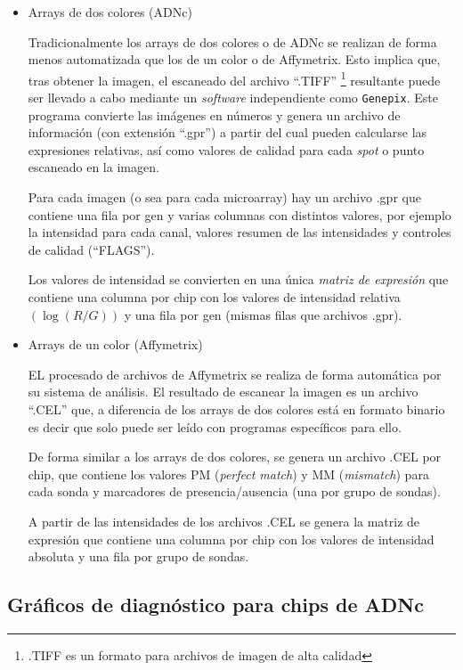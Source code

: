 \begin{itemize}
 \item Arrays de dos colores (ADNc)

Tradicionalmente los arrays de dos colores o de ADNc se realizan de forma menos automatizada que los de un color o de Affymetrix.
Esto implica que, tras obtener la imagen, el escaneado del archivo ``.TIFF''
\footnote{.TIFF es un formato para archivos de imagen de alta calidad} resultante puede ser llevado a cabo mediante un \emph{software} independiente
como \texttt{Genepix}.
Este programa convierte las im\'agenes en n\'umeros y genera un archivo de informaci\'on (con extensi\'on ``.gpr'') a partir del cual pueden
calcularse las expresiones relativas, as\'i como valores de calidad para cada \emph{spot} o punto escaneado en la imagen.

Para cada imagen (o sea para cada microarray) hay un archivo .gpr que contiene una fila por gen y
varias columnas con distintos valores, por ejemplo la intensidad para cada canal, valores resumen de las intensidades y
controles de calidad (``FLAGS'').

Los valores de intensidad se convierten en una \'unica \emph{matriz de expresi\'on} que contiene una columna por chip
con los valores de intensidad relativa $(\log\left (R/G \right ))$ y una fila por gen (mismas filas que archivos .gpr).


\item Arrays de un color (Affymetrix)

EL procesado de archivos de Affymetrix se realiza de forma autom\'atica por su sistema de an\'alisis. El resultado de escanear la imagen es un
archivo ``.CEL'' que, a diferencia de los arrays de dos colores est\'a en formato binario es decir que solo puede ser le\'ido con programas
espec\'ificos para ello.

De forma similar a los arrays de dos colores, se genera un archivo .CEL por chip, que contiene los valores PM (\emph{perfect match}) y
MM (\emph{mismatch}) para cada sonda y marcadores de presencia/ausencia (una por grupo de sondas).

A partir de las intensidades de los archivos .CEL se genera la matriz de expresi\'on que contiene una columna por chip
con los valores de intensidad absoluta y una fila por grupo de sondas.


\end{itemize}

\subsection{Gr\'aficos de diagn\'ostico para chips de ADNc}

